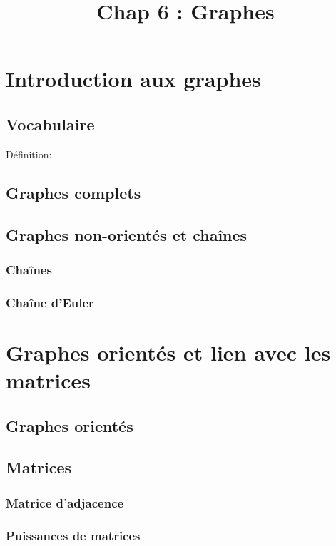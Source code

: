 \documentclass{article}
\title{\vspace{-2em}\Huge{\textbf{Chap 6 : Graphes}}\vspace{-1.5em}}
\author{}
\date{}
\begin{document}
    \maketitle

    \section{Introduction aux graphes}
        \subsection{Vocabulaire}
            Définition:\\
        
        \subsection{Graphes complets}
        \subsection{Graphes non-orientés et chaînes}
            \subsubsection{Chaînes}
            \subsubsection{Chaîne d'Euler}


    \section{Graphes orientés et lien avec les matrices}
        \subsection{Graphes orientés}
        \subsection{Matrices}
            \subsubsection{Matrice d'adjacence}
            \subsubsection{Puissances de matrices}
\end{document}
